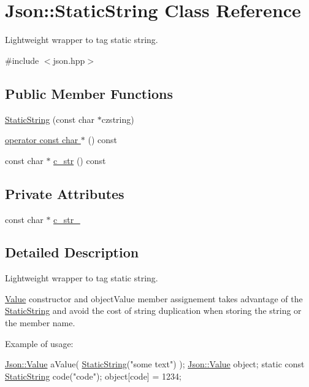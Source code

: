 \hypertarget{classJson_1_1StaticString}{}\section{Json\+:\+:Static\+String Class Reference}
\label{classJson_1_1StaticString}


Lightweight wrapper to tag static string.  




{\ttfamily \#include $<$json.\+hpp$>$}

\subsection*{Public Member Functions}
\begin{DoxyCompactItemize}
\item 
\hyperlink{classJson_1_1StaticString_afb6baf1ec078ce76f0b0f9b39d19437f}{Static\+String} (const char $\ast$czstring)
\item 
\hyperlink{classJson_1_1StaticString_ac2b334d46bbea4c0227e508fc66433e9}{operator const char $\ast$} () const 
\item 
const char $\ast$ \hyperlink{classJson_1_1StaticString_ab86fc6a3183adf12fdba4b370acf1754}{c\+\_\+str} () const 
\end{DoxyCompactItemize}
\subsection*{Private Attributes}
\begin{DoxyCompactItemize}
\item 
const char $\ast$ \hyperlink{classJson_1_1StaticString_a9f0d9e8caee8f8db14e2c8c24760dffd}{c\+\_\+str\+\_\+}
\end{DoxyCompactItemize}


\subsection{Detailed Description}
Lightweight wrapper to tag static string. 

\hyperlink{classJson_1_1Value}{Value} constructor and object\+Value member assignement takes advantage of the \hyperlink{classJson_1_1StaticString}{Static\+String} and avoid the cost of string duplication when storing the string or the member name.

Example of usage\+: 
\begin{DoxyCode}
\hyperlink{classJson_1_1Value}{Json::Value} aValue( \hyperlink{classJson_1_1StaticString_afb6baf1ec078ce76f0b0f9b39d19437f}{StaticString}(\textcolor{stringliteral}{"some text"}) );
\hyperlink{classJson_1_1Value}{Json::Value} object;
\textcolor{keyword}{static} \textcolor{keyword}{const} \hyperlink{classJson_1_1StaticString_afb6baf1ec078ce76f0b0f9b39d19437f}{StaticString} code(\textcolor{stringliteral}{"code"});
\textcolor{keywordtype}{object}[code] = 1234;
\end{DoxyCode}
 


